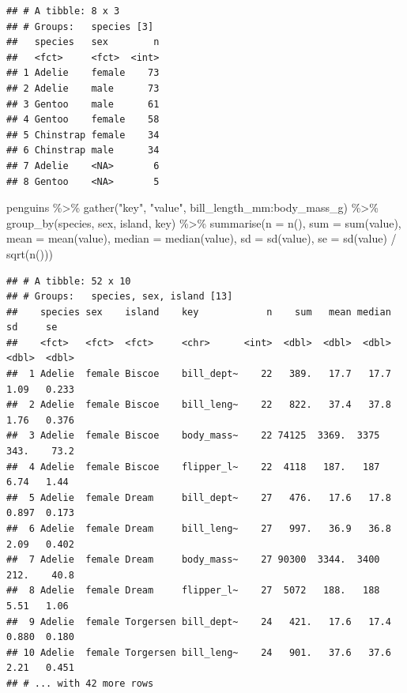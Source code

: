 \documentclass[
]{book}
\newenvironment{Shaded}{\begin{snugshade}}{\end{snugshade}}
\newcommand{\AttributeTok}[1]{\textcolor[rgb]{0.77,0.63,0.00}{#1}}
\newcommand{\FunctionTok}[1]{\textcolor[rgb]{0.00,0.00,0.00}{#1}}
\newcommand{\NormalTok}[1]{#1}
\newcommand{\SpecialCharTok}[1]{\textcolor[rgb]{0.00,0.00,0.00}{#1}}
\newcommand{\StringTok}[1]{\textcolor[rgb]{0.31,0.60,0.02}{#1}}
\begin{document}
\begin{verbatim}
## # A tibble: 8 x 3
## # Groups:   species [3]
##   species   sex        n
##   <fct>     <fct>  <int>
## 1 Adelie    female    73
## 2 Adelie    male      73
## 3 Gentoo    male      61
## 4 Gentoo    female    58
## 5 Chinstrap female    34
## 6 Chinstrap male      34
## 7 Adelie    <NA>       6
## 8 Gentoo    <NA>       5
\end{verbatim}

\begin{Shaded}
\begin{Highlighting}[]
\NormalTok{penguins }\SpecialCharTok{\%\textgreater{}\%}
  \FunctionTok{gather}\NormalTok{(}\StringTok{"key"}\NormalTok{, }\StringTok{"value"}\NormalTok{, bill\_length\_mm}\SpecialCharTok{:}\NormalTok{body\_mass\_g) }\SpecialCharTok{\%\textgreater{}\%}
  \FunctionTok{group\_by}\NormalTok{(species, sex, island, key) }\SpecialCharTok{\%\textgreater{}\%}
  \FunctionTok{summarise}\NormalTok{(}\AttributeTok{n =} \FunctionTok{n}\NormalTok{(),}
            \AttributeTok{sum =} \FunctionTok{sum}\NormalTok{(value),}
            \AttributeTok{mean =} \FunctionTok{mean}\NormalTok{(value),}
            \AttributeTok{median =} \FunctionTok{median}\NormalTok{(value),}
            \AttributeTok{sd =} \FunctionTok{sd}\NormalTok{(value),}
            \AttributeTok{se =} \FunctionTok{sd}\NormalTok{(value) }\SpecialCharTok{/} \FunctionTok{sqrt}\NormalTok{(}\FunctionTok{n}\NormalTok{()))}
\end{Highlighting}
\end{Shaded}

\begin{verbatim}
## # A tibble: 52 x 10
## # Groups:   species, sex, island [13]
##    species sex    island    key            n    sum   mean median      sd     se
##    <fct>   <fct>  <fct>     <chr>      <int>  <dbl>  <dbl>  <dbl>   <dbl>  <dbl>
##  1 Adelie  female Biscoe    bill_dept~    22   389.   17.7   17.7   1.09   0.233
##  2 Adelie  female Biscoe    bill_leng~    22   822.   37.4   37.8   1.76   0.376
##  3 Adelie  female Biscoe    body_mass~    22 74125  3369.  3375   343.    73.2  
##  4 Adelie  female Biscoe    flipper_l~    22  4118   187.   187     6.74   1.44 
##  5 Adelie  female Dream     bill_dept~    27   476.   17.6   17.8   0.897  0.173
##  6 Adelie  female Dream     bill_leng~    27   997.   36.9   36.8   2.09   0.402
##  7 Adelie  female Dream     body_mass~    27 90300  3344.  3400   212.    40.8  
##  8 Adelie  female Dream     flipper_l~    27  5072   188.   188     5.51   1.06 
##  9 Adelie  female Torgersen bill_dept~    24   421.   17.6   17.4   0.880  0.180
## 10 Adelie  female Torgersen bill_leng~    24   901.   37.6   37.6   2.21   0.451
## # ... with 42 more rows
\end{verbatim}
\end{document}
